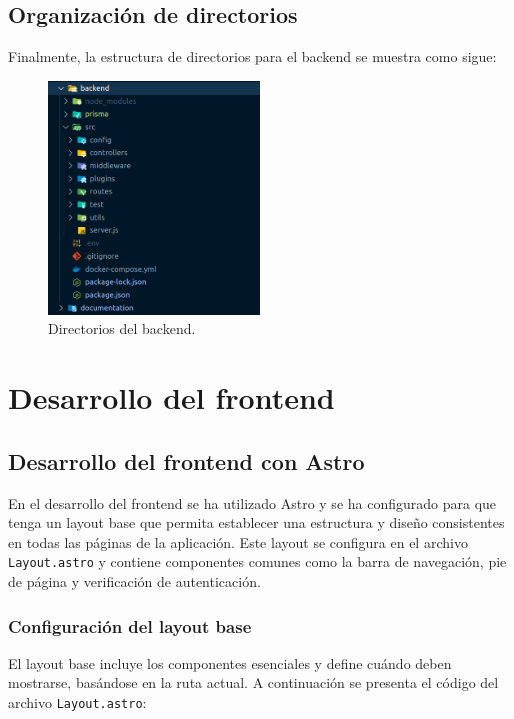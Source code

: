 \newpage

\subsection{Organización de directorios} Finalmente, la estructura de directorios para el backend se muestra como sigue:
\begin{figure}[h!]
	\centering
	\includegraphics[width=0.5\textwidth]{imagenes/orgback.png}
	\caption{Directorios del backend.}
\end{figure}



\section{Desarrollo del frontend}

\subsection{Desarrollo del frontend con Astro}

En el desarrollo del frontend se ha utilizado Astro y se ha configurado para que tenga un layout base que permita establecer una estructura y diseño consistentes en todas las páginas de la aplicación. Este layout se configura en el archivo \texttt{Layout.astro} y contiene componentes comunes como la barra de navegación, pie de página y verificación de autenticación.

\subsubsection{Configuración del layout base}

El layout base incluye los componentes esenciales y define cuándo deben mostrarse, basándose en la ruta actual. A continuación se presenta el código del archivo \texttt{Layout.astro}:

